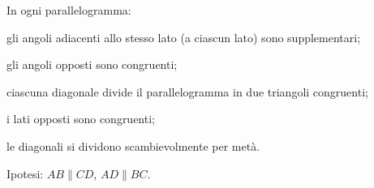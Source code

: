 \begin{teorema}
In ogni parallelogramma:
\begin{enumerate*}
\item gli angoli adiacenti allo stesso lato (a ciascun lato) sono supplementari;
\item gli angoli opposti sono congruenti;
\item ciascuna diagonale divide il parallelogramma in due triangoli congruenti;
\item i lati opposti sono congruenti;
\item le diagonali si dividono scambievolmente per metà. 
\end{enumerate*}
\end{teorema}

\noindent Ipotesi: $AB\parallel CD$, $AD\parallel BC$.

